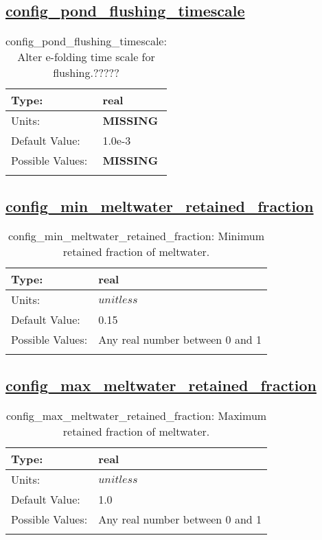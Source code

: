 \subsection[config\_pond\_flushing\_timescale]{\hyperref[sec:nm_tab_meltponds]{config\_pond\_flushing\_timescale}}
\label{subsec:nm_sec_config_pond_flushing_timescale}
\begin{center}
\begin{longtable}{| p{2.0in} || p{4.0in} |}
    \hline
    Type: & real \\
    \hline
    Units: & {\bf \color{red} MISSING} \\
    \hline
    Default Value: & 1.0e-3 \\
    \hline
    Possible Values: & {\bf \color{red} MISSING} \\
    \hline
    \caption{config\_pond\_flushing\_timescale: Alter e-folding time scale for flushing.?????}
\end{longtable}
\end{center}
\subsection[config\_min\_meltwater\_retained\_fraction]{\hyperref[sec:nm_tab_meltponds]{config\_min\_meltwater\_retained\_fraction}}
\label{subsec:nm_sec_config_min_meltwater_retained_fraction}
\begin{center}
\begin{longtable}{| p{2.0in} || p{4.0in} |}
    \hline
    Type: & real \\
    \hline
    Units: & $unitless$ \\
    \hline
    Default Value: & 0.15 \\
    \hline
    Possible Values: & Any real number between 0 and 1 \\
    \hline
    \caption{config\_min\_meltwater\_retained\_fraction: Minimum retained fraction of meltwater.}
\end{longtable}
\end{center}
\subsection[config\_max\_meltwater\_retained\_fraction]{\hyperref[sec:nm_tab_meltponds]{config\_max\_meltwater\_retained\_fraction}}
\label{subsec:nm_sec_config_max_meltwater_retained_fraction}
\begin{center}
\begin{longtable}{| p{2.0in} || p{4.0in} |}
    \hline
    Type: & real \\
    \hline
    Units: & $unitless$ \\
    \hline
    Default Value: & 1.0 \\
    \hline
    Possible Values: & Any real number between 0 and 1 \\
    \hline
    \caption{config\_max\_meltwater\_retained\_fraction: Maximum retained fraction of meltwater.}
\end{longtable}
\end{center}
